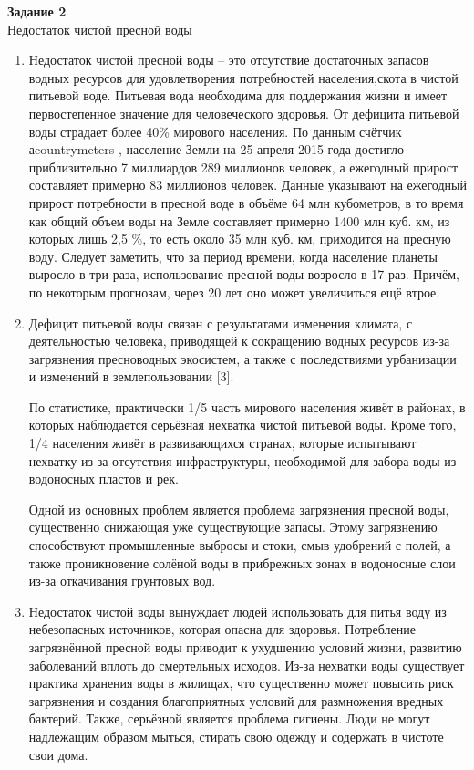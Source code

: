 {\Large
	\begin{center}
		\textbf{Задание 2} \\ Недостаток чистой пресной воды\end{center}}
	
\begin{enumerate}
		\item Недостаток чистой пресной воды -- это отсутствие достаточных запасов водных ресурсов для удовлетворения потребностей населения,скота в чистой питьевой воде. Питьевая вода необходима для поддержания жизни и имеет первостепенное значение для человеческого здоровья. От дефицита питьевой воды страдает более 40\% мирового населения.
		 По данным счётчик аcountrymeters , население Земли на 25 апреля 2015 года достигло приблизительно 7 миллиардов 289 миллионов человек, а ежегодный прирост составляет примерно 83 миллионов человек. \cite {litlink1} Данные указывают на ежегодный прирост потребности в пресной воде в объёме 64 млн кубометров, в то время как общий объем воды на Земле составляет примерно 1400 млн куб. км, из которых лишь 2,5 \%, то есть около 35 млн куб. км, приходится на пресную воду.\cite {litlink2} Следует заметить, что за период времени, когда население планеты выросло в три раза, использование пресной воды возросло в 17 раз. Причём, по некоторым прогнозам, через 20 лет оно может увеличиться ещё втрое.
		 \item Дефицит питьевой воды связан с результатами изменения климата, с деятельностью человека, приводящей к сокращению водных ресурсов из-за загрязнения пресноводных экосистем, а также с последствиями урбанизации и изменений в землепользовании [3].
		 
		 По статистике, практически 1/5 часть мирового населения живёт в районах, в которых наблюдается серьёзная нехватка чистой питьевой воды. Кроме того, 1/4 населения живёт в развивающихся странах, которые испытывают нехватку из-за отсутствия инфраструктуры, необходимой для забора воды из водоносных пластов и рек.
		 
		 Одной из основных проблем является проблема загрязнения пресной воды, существенно снижающая уже существующие запасы. Этому загрязнению способствуют промышленные выбросы и стоки, смыв удобрений с полей, а также проникновение солёной воды в прибрежных зонах в водоносные слои из-за откачивания грунтовых вод.
		  \item Недостаток чистой воды вынуждает людей использовать для питья воду из небезопасных источников, которая опасна для здоровья. Потребление загрязнённой пресной воды приводит к ухудшению условий жизни, развитию заболеваний вплоть до смертельных исходов. Из-за нехватки воды существует практика хранения воды в жилищах, что существенно может повысить риск загрязнения и создания благоприятных условий для размножения вредных бактерий. Также, серьёзной является проблема гигиены. Люди не могут надлежащим образом мыться, стирать свою одежду и содержать в чистоте свои дома.\cite {litlink2}
		  

\end{enumerate}
